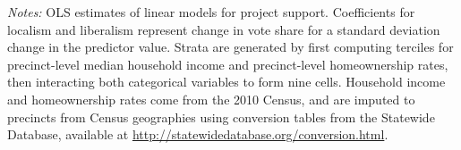 \documentclass[article,11pt]{memoir}
\begin{document}
\begin{table}
\begin{threeparttable}
\begin{tabularx}{\linewidth}{X}
  \end{tabularx}
  \begin{tablenotes}[flushleft]
    \item \hspace{-.2em}\emph{Notes:} OLS estimates of linear models for project support. Coefficients for localism and liberalism represent change in vote share for a standard deviation change in the predictor value. Strata are generated by first computing terciles for precinct-level median household income and precinct-level homeownership rates, then interacting both categorical variables to form nine cells. Household income and homeownership rates come from the 2010 Census, and are imputed to precincts from Census geographies using conversion tables from the Statewide Database, available at \url{http://statewidedatabase.org/conversion.html}.
  \end{tablenotes}
  \end{threeparttable}
\end{table}
\end{document}
